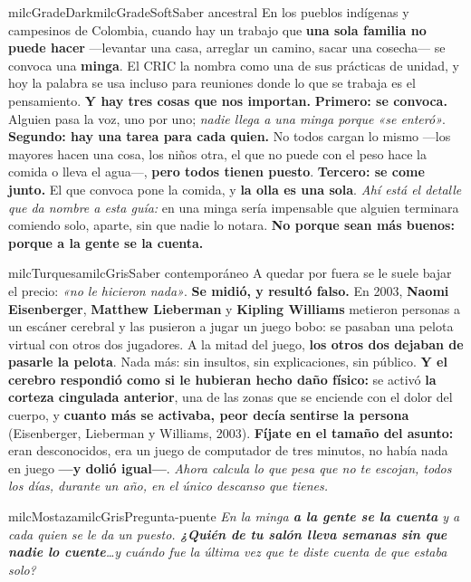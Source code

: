 \documentclass[11pt,letterpaper]{article}
\begin{document}
\begin{softbox}{milcGradeDark}{milcGradeSoft}{Saber ancestral}
En los pueblos indígenas y campesinos de Colombia, cuando hay un trabajo que \textbf{una sola familia no puede hacer} ---levantar una casa, arreglar un camino, sacar una cosecha--- se convoca una \textbf{minga}. El CRIC la nombra como una de sus prácticas de unidad, y hoy la palabra se usa incluso para reuniones donde lo que se trabaja es el pensamiento. \textbf{Y hay tres cosas que nos importan.} \textbf{Primero: se convoca.} Alguien pasa la voz, uno por uno; \emph{nadie llega a una minga porque «se enteró»}. \textbf{Segundo: hay una tarea para cada quien.} No todos cargan lo mismo ---los mayores hacen una cosa, los niños otra, el que no puede con el peso hace la comida o lleva el agua---, \textbf{pero todos tienen puesto}. \textbf{Tercero: se come junto.} El que convoca pone la comida, y \textbf{la olla es una sola}. \emph{Ahí está el detalle que da nombre a esta guía:} en una minga sería impensable que alguien terminara comiendo solo, aparte, sin que nadie lo notara. \textbf{No porque sean más buenos: porque a la gente se la cuenta.}
\end{softbox}

\begin{softbox}{milcTurquesa}{milcGris}{Saber contemporáneo}
A quedar por fuera se le suele bajar el precio: \emph{«no le hicieron nada»}. \textbf{Se midió, y resultó falso.} En 2003, \textbf{Naomi Eisenberger}, \textbf{Matthew Lieberman} y \textbf{Kipling Williams} metieron personas a un escáner cerebral y las pusieron a jugar un juego bobo: se pasaban una pelota virtual con otros dos jugadores. A la mitad del juego, \textbf{los otros dos dejaban de pasarle la pelota}. Nada más: sin insultos, sin explicaciones, sin público. \textbf{Y el cerebro respondió como si le hubieran hecho daño físico:} se activó \textbf{la corteza cingulada anterior}, una de las zonas que se enciende con el dolor del cuerpo, y \textbf{cuanto más se activaba, peor decía sentirse la persona} (Eisenberger, Lieberman y Williams, 2003). \textbf{Fíjate en el tamaño del asunto:} eran desconocidos, era un juego de computador de tres minutos, no había nada en juego \textbf{---y dolió igual---}. \emph{Ahora calcula lo que pesa que no te escojan, todos los días, durante un año, en el único descanso que tienes.}
\end{softbox}

\begin{softbox}{milcMostaza}{milcGris}{Pregunta-puente}
\textit{En la minga \textbf{a la gente se la cuenta} y a cada quien se le da un puesto. \textbf{¿Quién de tu salón lleva semanas sin que nadie lo cuente}\ldots y cuándo fue la última vez que te diste cuenta de que estaba solo?}
\end{softbox}
\end{document}
